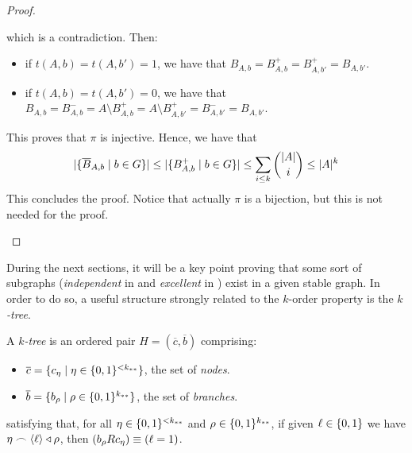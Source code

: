 \begin{corollary}[Claim 2.6.1]
\begin{proof}
\begin{enumerate}
                which is a contradiction.
                Then:
                \begin{itemize}
                    \item if $t(A,b) = t(A,b') = 1$, we have that $B_{A,b} = B^+_{A,b} = B^+_{A,b'} = B_{A,b'}$.
                    \item if $t(A,b) = t(A,b') = 0$, we have that
                    $B_{A,b} = B^-_{A,b} = A \setminus B^+_{A,b} = A \setminus B^+_{A,b'} = B^-_{A,b'} = B_{A,b'}$.
                \end{itemize}
                This proves that $\pi$ is injective.
                Hence, we have that
                \[
                    | \{ \overline{B}_{A,b} \mid b \in G \} | \leq
                    | \{ B^+_{A,b} \mid b \in G \} | \leq
                    \sum_{i \leq k} \binom{|A|}{i} \leq |A|^k
                \]
                This concludes the proof.
                Notice that actually $\pi$ is a bijection, but this is not needed for the proof.
        \end{enumerate}
        \end{proof}
    \end{corollary}

    During the next sections, it will be a key point proving that some sort of  subgraphs
    (\emph{independent} in  and \emph{excellent} in ) exist in a given
    stable graph.
    In order to do so, a useful structure strongly related to the $k$-order property is the \emph{$k$-tree}.

    \begin{definition} \label{def:k-tree}
        A \emph{$k$-tree} is an ordered pair $H = (\overline{c},\overline{b})$ comprising:
        \begin{itemize}
            \item $\overline{c} = \{  c_\eta \mid \eta \in \{ 0,1 \}^{<k_{**}}  \}$, the set of \emph{nodes}.
            \item $\overline{b} = \{  b_\rho \mid \rho \in \{ 0,1 \}^{k_{**}}  \}$, the set of \emph{branches}.
        \end{itemize}
        satisfying that, for all $\eta \in \{ 0,1 \}^{<k_{**}}$ and $\rho \in \{ 0,1 \}^{k_{**}}$,
        if given $\ell \in \{ 0, 1 \}$ we have $\eta \frown \left< \ell \right> \triangleleft \rho$, then
        $( b_\rho R c_\eta ) \equiv ( \ell = 1 )$.
    \end{definition}

